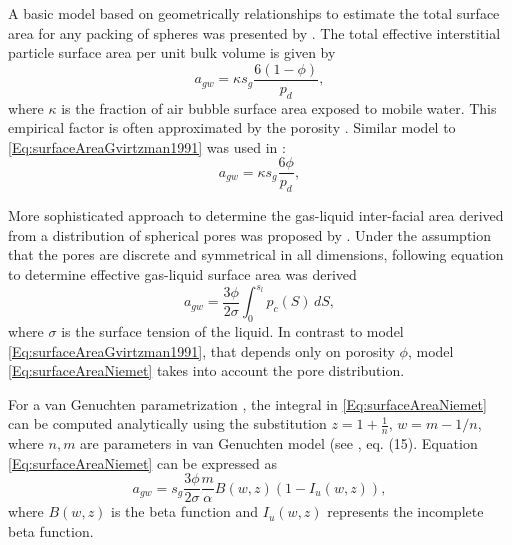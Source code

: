 \documentclass[a4paper,12pt]{article}
\newcommand{\Sl}{\mbox{$s_l\xspace$}}
\newcommand{\Sg}{\mbox{$s_g\xspace$}}
\newcommand{\agw}{\mbox{$a_{gw}\xspace$}}
\newcommand{\rp}{\mbox{$p_d\xspace$}} %
\begin{document}
A basic model based on geometrically relationships to estimate the
total surface area for any packing of spheres was presented by
\cite{Gvirtzman1991}. The total effective interstitial particle
surface area per unit bulk volume is given by
\begin{equation} \agw =\kappa \Sg
\frac{6(1-\phi)}{\rp}, \label{Eq:surfaceAreaGvirtzman1991}
\end{equation} where $\kappa$ is the fraction of air bubble surface
area exposed to mobile water. This empirical factor is often
approximated by the porosity \cite{Geistlinger2005}. Similar model to
\eqref{Eq:surfaceAreaGvirtzman1991} was used in
\cite{Geistlinger2005}:
\begin{equation} \agw = \kappa \Sg
\frac{6\phi}{\rp}, \label{Eq:surfaceAreaBasic}
\end{equation}




More sophisticated approach to determine the gas-liquid inter-facial
area derived from a distribution of spherical pores was proposed by
\cite{Niemet2002}. Under the assumption that the pores are discrete
and symmetrical in all dimensions, following equation to determine
effective gas-liquid surface area was derived
\begin{equation}
  \agw = \frac{3\phi}{2\sigma}
  \int_{0}^{\Sl}p_c(S) \, dS, \label{Eq:surfaceAreaNiemet}
\end{equation}
where $\sigma$ is the surface tension of the liquid. In contrast to
model \eqref{Eq:surfaceAreaGvirtzman1991}, that depends only on
porosity $\phi$, model \eqref{Eq:surfaceAreaNiemet} takes into account
the pore distribution.

For a van Genuchten parametrization \cite{Genuchten1980},
the integral in \eqref{Eq:surfaceAreaNiemet} can be computed
analytically using the substitution $z=1+\frac{1}{n}$, $w=m-1/n$,
where $n,m$ are parameters in van Genuchten model (see
\cite{Niemet2002}, eq. (15). Equation \eqref{Eq:surfaceAreaNiemet} can
be expressed as
\begin{equation} \agw = \Sg %
  \frac{3\phi}{2\sigma} \frac{m}{\alpha}
  B(w,z)\left(1-I_u(w,z)\right), \label{Eq:surfaceAreaNiemetComputed}
\end{equation}
where $B(w,z)$ is the beta function and $I_u(w,z)$
represents the incomplete beta function.
\end{document}
